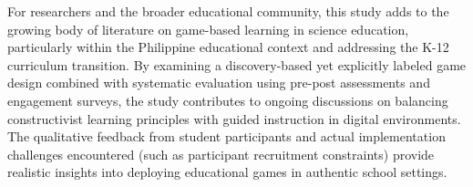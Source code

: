 For researchers and the broader educational community, this study adds to the growing body of literature on game-based learning in science education, particularly within the Philippine educational context and addressing the K-12 curriculum transition. By examining a discovery-based yet explicitly labeled game design combined with systematic evaluation using pre-post assessments and engagement surveys, the study contributes to ongoing discussions on balancing constructivist learning principles with guided instruction in digital environments. The qualitative feedback from student participants and actual implementation challenges encountered (such as participant recruitment constraints) provide realistic insights into deploying educational games in authentic school settings.
